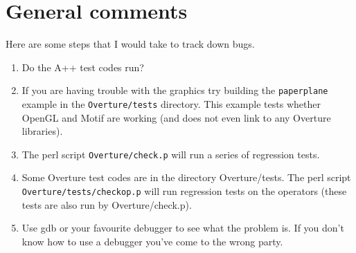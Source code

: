 \documentclass{article}
\begin{document}
\clearpage
\section{General comments}

Here are some steps that I would take to track down bugs.

\begin{enumerate}
  \item Do the A++ test codes run?
  \item If you are having trouble with the graphics try building the {\tt paperplane} example
     in the {\tt Overture/tests} directory. This example tests whether OpenGL and Motif are working (and does
     not even link to any Overture libraries). 
  \item The perl script {\tt Overture/check.p} will run a series of regression tests. 
  \item Some Overture test codes are in the directory Overture/tests. 
        The perl script {\tt Overture/tests/checkop.p} will
        run regression tests on the operators (these tests are also run by Overture/check.p). 
 \item Use gdb or your favourite debugger to see what the problem is. If you don't
    know how to use a debugger you've come to the wrong party.
\end{enumerate}

\clearpage



\end{document}
